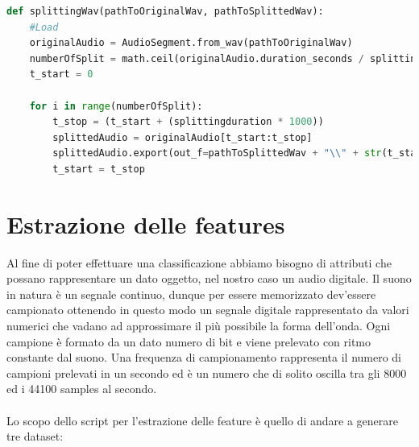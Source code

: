 \begin{lstlisting}[language=Python, caption=Splitting wav function, label = lst:splitFun]
def splittingWav(pathToOriginalWav, pathToSplittedWav):
    #Load
    originalAudio = AudioSegment.from_wav(pathToOriginalWav)
    numberOfSplit = math.ceil(originalAudio.duration_seconds / splittingduration)
    t_start = 0
    
    for i in range(numberOfSplit):
        t_stop = (t_start + (splittingduration * 1000))  
        splittedAudio = originalAudio[t_start:t_stop]
        splittedAudio.export(out_f=pathToSplittedWav + "\\" + str(t_start) + " - " + str(t_stop) + '.wav',format="wav")         
        t_start = t_stop
\end{lstlisting}

\section{Estrazione delle features}
\label{par:feat}
Al fine di poter effettuare una classificazione abbiamo bisogno di attributi che possano rappresentare un dato oggetto, nel nostro caso un audio digitale. Il suono in natura è un segnale continuo, dunque per essere memorizzato dev'essere campionato ottenendo in questo modo un segnale digitale rappresentato da valori numerici che vadano ad approssimare il più possibile la forma dell'onda. Ogni campione è formato da un dato numero di bit e viene prelevato con ritmo constante dal suono. Una frequenza di campionamento rappresenta il numero di campioni prelevati in un secondo ed è un numero che di solito oscilla tra gli 8000 ed i 44100 samples al secondo.
\\\\ 
Lo scopo dello script per l'estrazione delle feature è quello di andare a generare tre dataset: 
